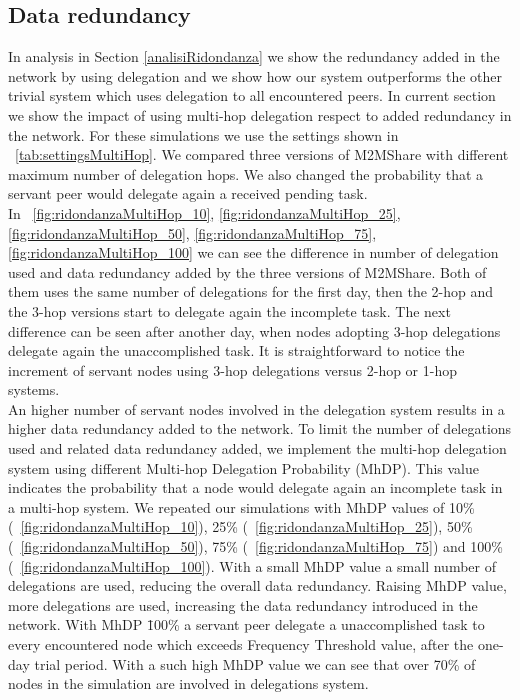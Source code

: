 \newpage
\subsection{Data redundancy}
\label{analisiRidondanzaMultiHop}
In analysis in Section \ref{analisiRidondanza} we show the redundancy added in the network by using delegation and we show how our system outperforms the other trivial system which uses delegation to all encountered peers. In current section we show the impact of using multi-hop delegation respect to added redundancy in the network. For these simulations we use the settings shown in \tablename~\ref{tab:settingsMultiHop}. We compared three versions of M2MShare with different maximum number of delegation hops. We also changed the probability that a servant peer would delegate again a received pending task.
\\

In \figurename~\ref{fig:ridondanzaMultiHop_10}, \ref{fig:ridondanzaMultiHop_25}, \ref{fig:ridondanzaMultiHop_50}, \ref{fig:ridondanzaMultiHop_75}, \ref{fig:ridondanzaMultiHop_100} we can see the difference in number of delegation used and data redundancy added by the three versions of M2MShare. Both of them uses the same number of delegations for the first day, then the 2-hop and the 3-hop versions start to delegate again the incomplete task. The next difference can be seen after another day, when nodes adopting 3-hop delegations delegate again the unaccomplished task. It is straightforward to notice the increment of servant nodes using 3-hop delegations versus 2-hop or 1-hop systems.
\\

An higher number of servant nodes involved in the delegation system results in a higher data redundancy added to the network. To limit the number of delegations used and related data redundancy added, we implement the multi-hop delegation system using different Multi-hop Delegation Probability (MhDP). This value indicates the probability that a node would delegate again an incomplete task in a multi-hop system. We repeated our simulations with MhDP values of 10\% (\figurename~\ref{fig:ridondanzaMultiHop_10}), 25\% (\figurename~\ref{fig:ridondanzaMultiHop_25}), 50\% (\figurename~\ref{fig:ridondanzaMultiHop_50}), 75\% (\figurename~\ref{fig:ridondanzaMultiHop_75}) and 100\% (\figurename~\ref{fig:ridondanzaMultiHop_100}). With a small MhDP value a small number of delegations are used, reducing the overall data redundancy. Raising MhDP value, more delegations are used, increasing the data redundancy introduced in the network. With MhDP \= 100\% a servant peer delegate a unaccomplished task to every encountered node which exceeds Frequency Threshold value, after the one-day trial period. With a such high MhDP value we can see that over 70\% of nodes in the simulation are involved in delegations system.


